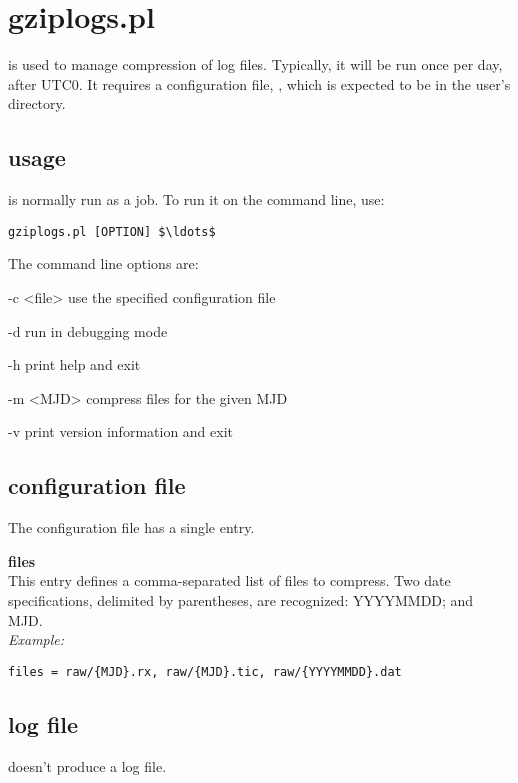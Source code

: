 \section{gziplogs.pl \label{s:gziplogs}}

 is used to manage compression of log files. 
Typically, it will be run once per day, after UTC0. It requires 
a configuration file, , which is expected to be
in the user's  directory. 

\subsection{usage}

 is normally run as a  job. To run it on the command line, use:
\begin{lstlisting}[mathescape=true]
gziplogs.pl [OPTION] $\ldots$
\end{lstlisting}
The command line options are:
\begin{description*}
	\item[-c \textless file\textgreater] use the specified configuration file
	\item[-d]	run in debugging mode
	\item[-h]	print help and exit
	\item[-m \textless MJD\textgreater] compress files for the given MJD
	\item[-v]	print version information and exit
\end{description*}

\subsection{configuration file}

The configuration file has a single entry.

{\bfseries files}\\
This entry defines a comma-separated list of files to compress. Two date specifications, 
delimited by parentheses, are recognized: YYYYMMDD; and MJD.\\
\textit{Example:}
\begin{lstlisting}
files = raw/{MJD}.rx, raw/{MJD}.tic, raw/{YYYYMMDD}.dat
\end{lstlisting}

\subsection{log file}

 doesn't produce a log file.